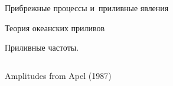 \begin{chapter}{Прибрежные процессы и~приливные явления}
\begin{section}{Теория океанских приливов}
\begin{paragraph}{Приливные частоты.}
\begin{table} [b!]
\begin{tabular*}{121mm}{@{\extracolsep{\fill}}lcccccccc@{}}
\hline
\end{tabular*}
{\footnotesize{\dag Amplitudes from Apel (1987)}}
\end{table}
%

\end{paragraph}
\end{section}
\end{chapter}
